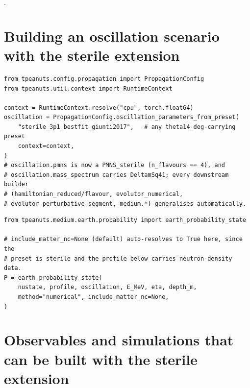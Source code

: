 \begin{refbox}
\cite{GariazzoGiuntiLavederLi2017,IceCube2020SterileNumuDisappearance,KoppMachadoMaltoniSchwetz2013}.
\end{refbox}

\section{Building an oscillation scenario with the sterile extension}

\begin{examplebox}[title={Attaching a sterile preset to a propagation config}]
\begin{lstlisting}[style=tpython]
from tpeanuts.config.propagation import PropagationConfig
from tpeanuts.util.context import RuntimeContext

context = RuntimeContext.resolve("cpu", torch.float64)
oscillation = PropagationConfig.oscillation_parameters_from_preset(
    "sterile_3p1_bestfit_giunti2017",   # any theta14_deg-carrying preset
    context=context,
)
# oscillation.pmns is now a PMNS_sterile (n_flavours == 4), and
# oscillation.mass_spectrum carries DeltamSq41; every downstream builder
# (hamiltonian_reduced/flavour, evolutor_numerical,
# evolutor_perturbative_segment, medium.*) generalises automatically.
\end{lstlisting}
\end{examplebox}

\begin{examplebox}[title={Enabling the sterile neutral-current term}]
\begin{lstlisting}[style=tpython]
from tpeanuts.medium.earth.probability import earth_probability_state

# include_matter_nc=None (default) auto-resolves to True here, since the
# preset is sterile and the profile below carries neutron-density data.
P = earth_probability_state(
    nustate, profile, oscillation, E_MeV, eta, depth_m,
    method="numerical", include_matter_nc=None,
)
\end{lstlisting}
\end{examplebox}

\section{Observables and simulations that can be built with the sterile extension}

